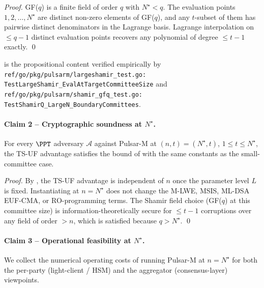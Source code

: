 \begin{proof}
GF($q$) is a finite field of order $q$ with $N^\star < q$. The
evaluation points $1, 2, \dots, N^\star$ are distinct non-zero
elements of GF($q$), and any $t$-subset of them has pairwise
distinct denominators in the Lagrange basis. Lagrange interpolation
on $\le q - 1$ distinct evaluation points recovers any polynomial of
degree $\le t - 1$ exactly. \qed
\end{proof}

 is the propositional content
verified empirically by
\texttt{ref/go/pkg/pulsarm/largeshamir\_test.go:\\TestLargeShamir\_EvalAtTargetCommitteeSize}
and
\texttt{ref/go/pkg/pulsarm/shamir\_gfq\_test.go:\\TestShamirQ\_LargeN\_BoundaryCommittees}.

\paragraph{Claim 2 -- Cryptographic soundness at $N^\star$.}

\begin{theorem}
\label{thm:pulsar-m-soundness-at-N-star}
For every $\PPT$ adversary $\mathcal{A}$ against Pulsar-M at
$(n, t) = (N^\star, t)$, $1 \le t \le N^\star$, the TS-UF advantage
satisfies the bound of  with the same
constants as the small-committee case.
\end{theorem}

\begin{proof}
By , the TS-UF advantage is independent
of $n$ once the parameter level $L$ is fixed. Instantiating at
$n = N^\star$ does not change the M-LWE, MSIS, ML-DSA EUF-CMA, or
RO-programming terms. The Shamir field choice (GF($q$) at this
committee size) is information-theoretically secure for $\le t-1$
corruptions over any field of order $> n$, which is satisfied
because $q > N^\star$. \qed
\end{proof}

\paragraph{Claim 3 -- Operational feasibility at $N^\star$.}

We collect the numerical operating costs of running Pulsar-M at
$n = N^\star$ for both the per-party (light-client / HSM) and the
aggregator (consensus-layer) viewpoints.


